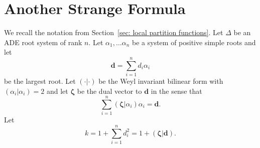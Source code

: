 \documentclass{amsart}
\theoremstyle{definition}
\newcommand{\half}{\frac{1}{2}}
\newcommand{\M}{\mathfrak{M}}
\newcommand{\mdata}{\mathfrak{m}}
\newcommand{\FM}{\mathsf{FM}}
\renewcommand{\O}{\mathcal{O}}
\newcommand{\Zcal}{\mathcal{Z}}
\newcommand{\zetavec}{\bm{\zeta }}
\newcommand{\dvec}{\bm{d }}
\newcommand{\Hilb}{\operatorname{Hilb}}
\begin{document}
\begin{comment}
	\]
	Tensoring by $L_{\mdata} = \O (-D_{\mdata})$ induces an equivalence of categories and
	thus the composition
	\[
	\begin{tikzcd}[column sep = large]
	\M^{\alpha}(\Zcal ) \arrow[r,"{\FM }"]&
	\M_{\beta}(Y) \arrow[r,"{L_{\mdata}\otimes -}"] &
	\M_{\beta \cdot (1,-D_{\mdata},\half D_{\mdata}^{2})}(Y)
	\end{tikzcd}
	\] 
	induces an equivalence
	\[
	\M^{\alpha}(\Zcal )\cong \M_{(1,0,-n-\half D_{\mdata}^{2})}(Y).
	\]
	Since our moduli spaces
	\[
	\Hilb^{n,\mdata}(\Zcal )\subset \M^{\alpha}(\Zcal)\quad \text{ and } \quad \Hilb^{n+\half D_{\mdata}^{2}}(Y)\subset \M_{(1,0,-n-\half D_{\mdata}^{2})}(Y)
	\]
	are open substacks, the image of
	$\Hilb^{n,\mdata}(\Zcal )$ under the equivalence $\FM \circ
	(L_{\mdata}\otimes -)$ intersects $\Hilb^{n+\half D_{\mdata}^{2}}(Y)$ nontrivially. Hence, $\FM \circ
	(L_{\mdata}\otimes -)$ induces an isomorphism on open subsets of the two Hilbert schemes. 
\end{remark}
\end{comment}


\appendix
\section{Another Strange Formula}\label{sec: another strange
formula}

We recall the notation from Section~\ref{sec: local partition
functions}. Let $\Delta$ be an ADE root system of rank $n$. Let
$\alpha_{1},\dotsc \alpha_{n}$ be a system of positive simple roots
and let
\[
\dvec  = \sum_{i=1}^{n} d_{i} \alpha_{i}
\]
be the largest root. Let $(\cdot |\cdot )$ be the Weyl invariant
bilinear form with $(\alpha_{i}|\alpha_{i})=2$ and let $\zetavec$ be
the dual vector to $\dvec$ in the sense that
\begin{equation}\label{eqn: d = sum (zeta|ai)ai}
\sum_{i=1}^{n} (\zetavec |\alpha_{i}) \alpha_{i} = \dvec .
\end{equation}
Let 
\begin{equation}\label{eqn: k=1+(zeta|d)}
k=1+\sum_{i=1}^{n}d_{i}^{2} =  1+(\zetavec |\dvec ). 
\end{equation}
\end{document}
